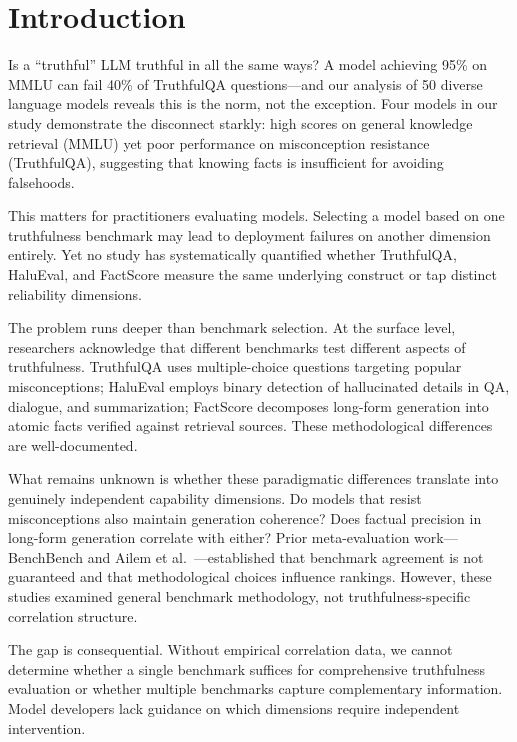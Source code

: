 \section{Introduction}

Is a ``truthful'' LLM truthful in all the same ways? A model achieving 95\% on MMLU can fail 40\% of TruthfulQA questions---and our analysis of 50 diverse language models reveals this is the norm, not the exception. Four models in our study demonstrate the disconnect starkly: high scores on general knowledge retrieval (MMLU) yet poor performance on misconception resistance (TruthfulQA), suggesting that knowing facts is insufficient for avoiding falsehoods.

This matters for practitioners evaluating models. Selecting a model based on one truthfulness benchmark may lead to deployment failures on another dimension entirely. Yet no study has systematically quantified whether TruthfulQA, HaluEval, and FactScore measure the same underlying construct or tap distinct reliability dimensions.

The problem runs deeper than benchmark selection. At the surface level, researchers acknowledge that different benchmarks test different aspects of truthfulness. TruthfulQA uses multiple-choice questions targeting popular misconceptions; HaluEval employs binary detection of hallucinated details in QA, dialogue, and summarization; FactScore decomposes long-form generation into atomic facts verified against retrieval sources. These methodological differences are well-documented.

What remains unknown is whether these paradigmatic differences translate into genuinely independent capability dimensions. Do models that resist misconceptions also maintain generation coherence? Does factual precision in long-form generation correlate with either? Prior meta-evaluation work---BenchBench \cite{perlitz2024benchbench} and Ailem et al.\ \cite{ailem2024robustness}---established that benchmark agreement is not guaranteed and that methodological choices influence rankings. However, these studies examined general benchmark methodology, not truthfulness-specific correlation structure.

The gap is consequential. Without empirical correlation data, we cannot determine whether a single benchmark suffices for comprehensive truthfulness evaluation or whether multiple benchmarks capture complementary information. Model developers lack guidance on which dimensions require independent intervention.

